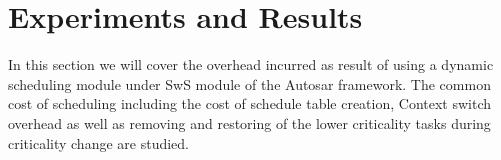 \section{Experiments and Results}
In this section we will cover the overhead incurred as result of using a dynamic 
scheduling module under SwS module of the Autosar framework.
The common cost of scheduling including the cost of schedule table creation, Context 
switch overhead as well as removing and restoring of the lower criticality tasks 
during criticality change are studied.
